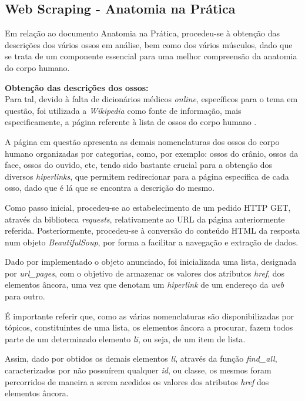 \subsection{Web Scraping - Anatomia na Prática}

Em relação ao documento Anatomia na Prática, procedeu-se à obtenção das descrições dos vários ossos em análise, bem como dos vários músculos, dado que se trata de um componente essencial para uma melhor compreensão da anatomia do corpo humano.

\textbf{Obtenção das descrições dos ossos:}\\
Para tal, devido à falta de dicionários médicos \textit{online}, específicos para o tema em questão, foi utilizada a \textit{Wikipedia} como fonte de informação, mais especificamente, a página referente à lista de ossos do corpo humano \cite{wikipedia2024ossos}.


A página em questão apresenta as demais nomenclaturas dos ossos do corpo humano organizadas por categorias, como, por exemplo: ossos do crânio, ossos da face, ossos do ouvido, etc, tendo sido bastante crucial para a obtenção dos diversos \textit{hiperlinks}, que permitem redirecionar para a página específica de cada osso, dado que é lá que se encontra a descrição do mesmo. 

Como passo inicial, procedeu-se ao estabelecimento de um pedido HTTP GET, através da biblioteca \textit{requests}, relativamente ao URL da página anteriormente referida. Posteriormente, procedeu-se à conversão do conteúdo HTML da resposta num objeto \textit{BeautifulSoup}, por forma a facilitar a navegação e extração de dados.

Dado por implementado o objeto anunciado, foi inicializada uma lista, designada por \textit{url\_pages}, com o objetivo de armazenar os valores dos atributos \textit{href}, dos elementos âncora, uma vez que denotam um \textit{hiperlink} de um endereço da \textit{web} para outro.

É importante referir que, como as várias nomenclaturas são disponibilizadas por tópicos, constituintes de uma lista, os elementos âncora a procurar, fazem todos parte de um determinado elemento \textit{li}, ou seja, de um item de lista.

Assim, dado por obtidos os demais elementos \textit{li}, através da função \textit{find\_all}, caracterizados por não possuírem qualquer \textit{id}, ou classe, os mesmos foram percorridos de maneira a serem acedidos os valores dos atributos \textit{href} dos elementos âncora. 

